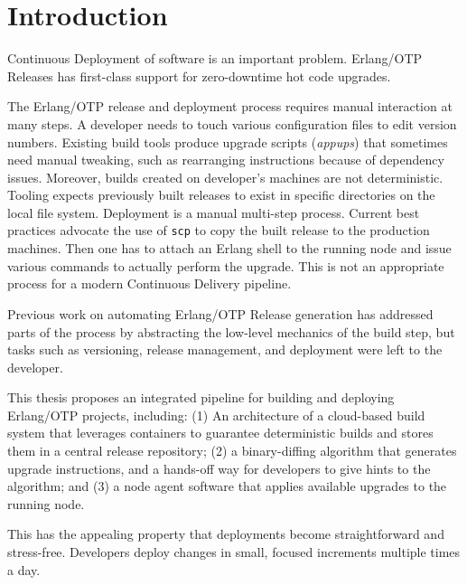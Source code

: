 \chapter{Introduction}



Continuous Deployment of software is an important problem.
Erlang/OTP Releases has first-class support for zero-downtime hot code upgrades.


The Erlang/OTP release and deployment process requires manual interaction at many steps.
A developer needs to touch various configuration files to edit version numbers.
Existing build tools produce upgrade scripts (\emph{appups}) that sometimes need manual tweaking, such as rearranging instructions because of dependency issues.
Moreover, builds created on developer's machines are not deterministic. Tooling expects previously built releases to exist in specific directories on the local file system.
Deployment is a manual multi-step process. Current best practices advocate the use of \lstinline{scp} to copy the built release to the production machines. Then one has to attach an Erlang shell to the running node and issue various commands to actually perform the upgrade. This is not an appropriate process for a modern Continuous Delivery pipeline.


Previous work on automating Erlang/OTP Release generation has addressed parts of the process by abstracting the low-level mechanics of the build step, but tasks such as versioning, release management, and deployment were left to the developer.


This thesis proposes an integrated pipeline for building and deploying Erlang/OTP projects, including: (1) An architecture of a cloud-based build system that leverages containers to guarantee deterministic builds and stores them in a central release repository; (2) a binary-diffing algorithm that generates upgrade instructions, and a hands-off way for developers to give hints to the algorithm; and (3) a node agent software that applies available upgrades to the running node.


This has the appealing property that deployments become straightforward and stress-free. Developers deploy changes in small, focused increments  multiple times a day.
